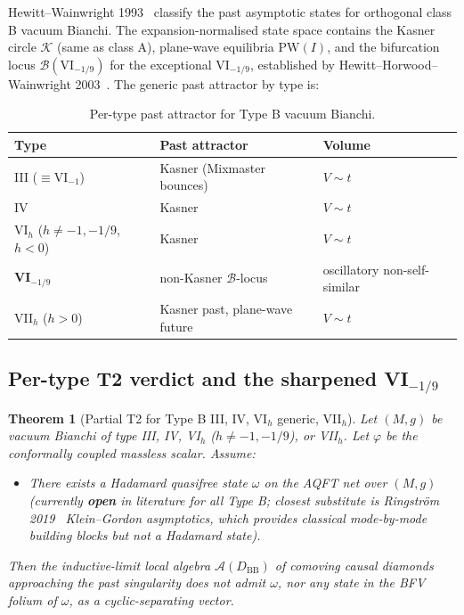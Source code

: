 \documentclass[11pt]{article}
\newtheorem{theorem}{Theorem}
\theoremstyle{definition}
\renewcommand{\AA}{\mathcal{A}}
\newcommand{\BB}{\mathrm{BB}}
\begin{document}
Hewitt--Wainwright 1993~\cite{HewittWainwright1993} classify the past asymptotic states for orthogonal class B vacuum Bianchi. The expansion-normalised state space contains the Kasner circle $\mathcal K$ (same as class A), plane-wave equilibria $\mathrm{PW}(I)$, and the bifurcation locus $\mathcal B(\mathrm{VI}_{-1/9})$ for the exceptional VI$_{-1/9}$, established by Hewitt--Horwood--Wainwright 2003~\cite{HewittHorwoodWainwright2003}. The generic past attractor by type is:
\begin{table}[ht]
\centering
\begin{tabular}{|l|l|l|}
\hline
Type & Past attractor & Volume \\
\hline
III ($\equiv\mathrm{VI}_{-1}$) & Kasner (Mixmaster bounces) & $V\sim t$ \\
IV & Kasner & $V\sim t$ \\
VI$_h$ ($h\neq -1,-1/9$, $h<0$) & Kasner & $V\sim t$ \\
\textbf{VI$_{-1/9}$} & non-Kasner $\mathcal B$-locus~\cite{HewittHorwoodWainwright2003} & oscillatory non-self-similar \\
VII$_h$ ($h>0$) & Kasner past, plane-wave future & $V\sim t$ \\
\hline
\end{tabular}
\caption{Per-type past attractor for Type B vacuum Bianchi.}
\label{tab:typeB-attractor}
\end{table}

\subsection{\texorpdfstring{Per-type T2 verdict and the sharpened VI$_{-1/9}$}{Per-type T2 verdict and the sharpened VI\_\{-1/9\}}}\label{sec:typeB-verdicts}

\begin{theorem}[Partial T2 for Type B III, IV, VI$_h$ generic, VII$_h$]\label{thm:T2-typeB}
Let $(M,g)$ be vacuum Bianchi of type III, IV, VI$_h$ ($h\neq -1, -1/9$), or VII$_h$. Let $\varphi$ be the conformally coupled massless scalar. Assume:
\begin{itemize}
\item[(H)] There exists a Hadamard quasifree state $\omega$ on the AQFT net over $(M,g)$ (currently \textbf{open} in literature for all Type B; closest substitute is Ringstr\"om 2019~\cite{Ringstrom2019} Klein--Gordon asymptotics, which provides classical mode-by-mode building blocks but not a Hadamard state).
\end{itemize}
Then the inductive-limit local algebra $\AA(D_\BB)$ of comoving causal diamonds approaching the past singularity does \emph{not} admit $\omega$, nor any state in the BFV folium of $\omega$, as a cyclic-separating vector.
\end{theorem}
\end{document}
